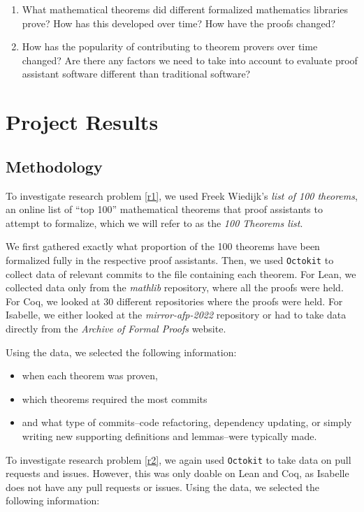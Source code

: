 \documentclass[sigconf,nonacm]{acmart}
\begin{document}
\begin{enumerate}
    \item\label{r1} What mathematical theorems did different formalized mathematics libraries prove? How has this developed over time? How have the proofs changed?
    \item\label{r2} How has the popularity of contributing to theorem provers over time changed? Are there any factors we need to take into account to evaluate proof assistant software different than traditional software?
\end{enumerate}


\section{Project Results}

\subsection{Methodology}

To investigate research problem \ref{r1}, we used Freek Wiedijk's \textit{list of 100 theorems}\cite{wiedijk}, an online list of ``top 100'' mathematical theorems that proof assistants to attempt to formalize, which we will refer to as the \textit{100 Theorems list}.

We first gathered exactly what proportion of the 100 theorems have been formalized fully in the respective proof assistants. Then, we used \texttt{Octokit} to collect data of relevant commits to the file containing each theorem. For Lean, we collected data only from the \textit{mathlib} repository, where all the proofs were held. For Coq, we looked at 30 different repositories where the proofs were held. For Isabelle, we either looked at the \textit{mirror-afp-2022} repository or had to take data directly from the \textit{Archive of Formal Proofs} website.

Using the data, we selected the following information:
\begin{itemize}
  \item when each theorem was proven,
  \item which theorems required the most commits
  \item and what type of commits--code refactoring, dependency updating, or simply writing new supporting definitions and lemmas--were typically made.
\end{itemize}

To investigate research problem \ref{r2}, we again used \texttt{Octokit} to take data on pull requests and issues. However, this was only doable on Lean and Coq, as Isabelle does not have any pull requests or issues. Using the data, we selected the following information:
\end{document}
